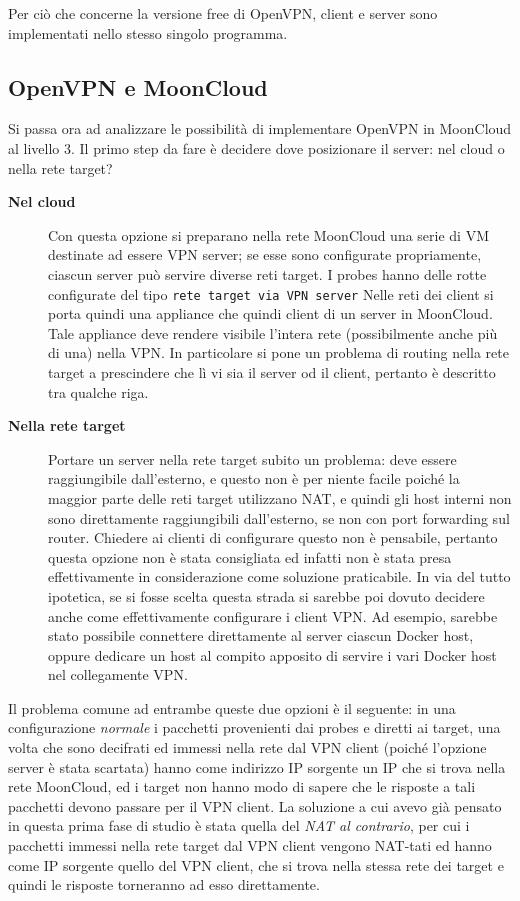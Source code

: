 Per ciò che concerne la versione free di OpenVPN, client e server sono implementati
nello stesso singolo programma.

\subsection{OpenVPN e MoonCloud}
Si passa ora ad analizzare le possibilità di implementare OpenVPN in MoonCloud al livello 3. Il primo step
da fare è decidere dove posizionare il server: nel cloud o nella rete target?
\begin{description}
  \item[\textbf{Nel cloud}]Con questa opzione si preparano nella rete MoonCloud una serie
  di VM destinate ad essere VPN server; se esse sono configurate propriamente, ciascun server
  può servire diverse reti target. I probes
  hanno delle rotte configurate del tipo \texttt{rete target via VPN server}
  Nelle reti dei client si porta quindi una appliance che quindi client di un server in MoonCloud.
  Tale appliance deve rendere visibile l'intera rete (possibilmente anche più di una) nella VPN. In
  particolare si pone un problema di routing nella rete target a prescindere che lì vi sia
  il server od il client, pertanto è descritto tra qualche riga.
  \item[\textbf{Nella rete target}]Portare un server nella rete target subito un problema: deve
  essere raggiungibile dall'esterno, e questo non è per niente facile poiché la maggior parte
  delle reti target utilizzano NAT, e quindi gli host interni non sono direttamente raggiungibili
  dall'esterno, se non con port forwarding sul router. Chiedere ai clienti di configurare
  questo non è pensabile, pertanto questa opzione non è stata consigliata ed infatti
  non è stata presa effettivamente in considerazione come soluzione praticabile.
  In via del tutto ipotetica, se si fosse scelta questa strada si sarebbe poi
  dovuto decidere anche come effettivamente configurare i client VPN. Ad esempio,
  sarebbe stato possibile connettere direttamente al server ciascun Docker host, oppure
  dedicare un host al compito apposito di servire i vari Docker host nel collegamente VPN.
\end{description}
Il problema comune ad entrambe queste due opzioni è il seguente: in una configurazione
\textit{normale} i pacchetti provenienti dai probes e diretti ai target, una volta che
sono decifrati ed immessi nella rete dal VPN client (poiché l'opzione server
è stata scartata) hanno come indirizzo IP sorgente un IP che si trova nella rete MoonCloud,
ed i target non hanno modo di sapere che le risposte a tali pacchetti devono passare
per il VPN client. La soluzione a cui avevo già pensato in questa prima fase di studio
è stata quella del \textit{NAT al contrario}, per cui i pacchetti immessi nella rete
target dal VPN client vengono NAT-tati ed hanno come IP sorgente quello del VPN
client, che si trova nella stessa rete dei target e quindi le risposte torneranno
ad esso direttamente.

